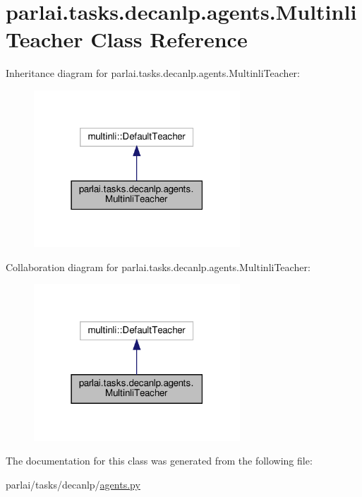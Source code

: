 \hypertarget{classparlai_1_1tasks_1_1decanlp_1_1agents_1_1MultinliTeacher}{}\section{parlai.\+tasks.\+decanlp.\+agents.\+Multinli\+Teacher Class Reference}
\label{classparlai_1_1tasks_1_1decanlp_1_1agents_1_1MultinliTeacher}


Inheritance diagram for parlai.\+tasks.\+decanlp.\+agents.\+Multinli\+Teacher\+:
\nopagebreak
\begin{figure}[H]
\begin{center}
\leavevmode
\includegraphics[width=219pt]{classparlai_1_1tasks_1_1decanlp_1_1agents_1_1MultinliTeacher__inherit__graph}
\end{center}
\end{figure}


Collaboration diagram for parlai.\+tasks.\+decanlp.\+agents.\+Multinli\+Teacher\+:
\nopagebreak
\begin{figure}[H]
\begin{center}
\leavevmode
\includegraphics[width=219pt]{classparlai_1_1tasks_1_1decanlp_1_1agents_1_1MultinliTeacher__coll__graph}
\end{center}
\end{figure}


The documentation for this class was generated from the following file\+:\begin{DoxyCompactItemize}
\item 
parlai/tasks/decanlp/\hyperlink{parlai_2tasks_2decanlp_2agents_8py}{agents.\+py}\end{DoxyCompactItemize}
